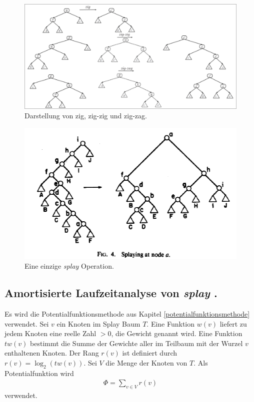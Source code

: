 \documentclass[a4paper,12pt]{article}
\begin{document}
\begin{figure}[H]
	\centering
	\includegraphics[width= 1.2\textwidth]{Medien/Splaybaum/zigZag}
	\caption{Darstellung von zig, zig-zig und zig-zag. }
	\label{fig:zigZag}
\end{figure}
\begin{figure}[H]
	\centering
	\includegraphics[width= 1\textwidth]{Medien/Splaybaum/splay}
	\caption{Eine einzige \textit{splay } Operation.\cite{splay}}
	\label{fig:splay}
\end{figure}

\subsection{Amortisierte Laufzeitanalyse von \textit{splay }.}
Es wird die Potentialfunktionsmethode aus Kapitel \ref{potentialfunktionsmethode} verwendet. Sei $v$ ein Knoten im Splay Baum $T$. Eine Funktion $w\left(v\right)$ liefert zu jedem Knoten eine reelle Zahl $>0$, die Gewicht genannt wird. Eine Funktion $\mathit{tw}\left(v\right)$ bestimmt die Summe der Gewichte aller im Teilbaum mit der Wurzel $v$ enthaltenen Knoten. Der Rang  $r\left(v\right)$ ist definiert durch $r\left(v\right) = \log_2 \left( \mathit{tw}\left(v\right)\right)$. Sei $V$ die Menge der Knoten von $T$. Als Potentialfunktion wird 
\begin{align*}
\Phi = \sum_{v \in V} r\left(v\right)
\end{align*}
verwendet.
\end{document}
